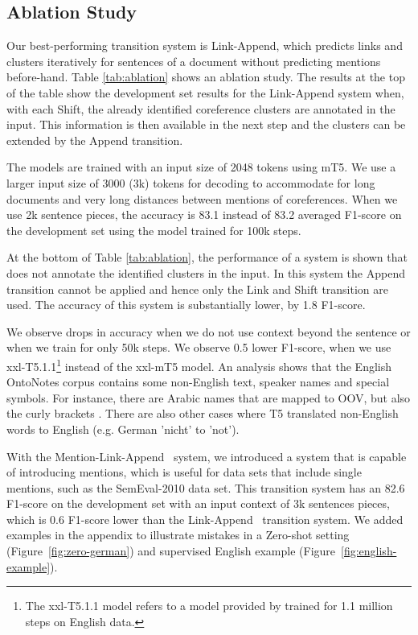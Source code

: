 \documentclass[11pt,a4paper]{article}
\newcommand{\LA}{Link-Append}
\newcommand{\M}{Mention-Link-Append}
\begin{document}
\subsection{Ablation Study}

Our best-performing transition system is Link-Append, which predicts links and clusters iteratively for sentences of a document without predicting mentions before-hand. Table \ref{tab:ablation} shows an ablation study. The results at the top of the table show the development set results for the Link-Append system when, with each {\sc Shift}, the already identified coreference clusters are annotated in the input. This information is then available in the next step and the clusters can be extended by the {\sc Append} transition.


The models are trained with an input size of 2048 tokens using mT5. We use a larger input size of 3000 (3k) tokens for decoding to accommodate for long documents and very long distances between mentions of coreferences. When we use 2k sentence pieces, the accuracy is 83.1 instead of 83.2 averaged F1-score on the development set using the model trained for 100k steps. 

At the bottom of Table \ref{tab:ablation}, the performance of a system is shown that does not annotate the identified clusters in the input. In this system the Append transition cannot be applied and hence only the Link and Shift transition are used. The accuracy of this system is substantially lower, by 1.8 F1-score. 

We observe drops in accuracy when we do not use context beyond the sentence  or when we train for only 50k steps. We observe 0.5 lower F1-score, when we use xxl-T5.1.1\footnote{The xxl-T5.1.1 model refers to a model provided by  trained for 1.1 million steps on English data.} instead of the xxl-mT5 model. An analysis shows that the English OntoNotes corpus contains some non-English text, speaker names and special symbols. For instance, there are Arabic names that are mapped to OOV, but also the curly brackets . There are also other cases where T5 translated non-English words to English (e.g. German 'nicht' to 'not'). 
 
With the \M~ system, we introduced a system that is capable of introducing mentions, which is useful for data sets that include single mentions, such as the SemEval-2010 data set. This transition system has an 82.6 F1-score on the development set with an input context of 3k sentences pieces, which is 0.6 F1-score lower than the \LA~ transition system. 
We added  examples in the appendix to illustrate mistakes in a Zero-shot setting (Figure~\ref{fig:zero-german}) and supervised English example (Figure~\ref{fig:english-example}). 
\end{document}
